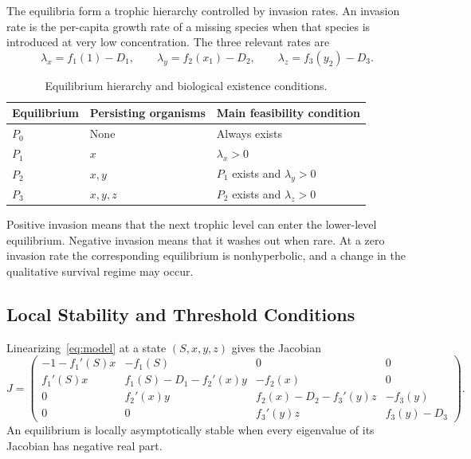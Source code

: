 The equilibria form a trophic hierarchy controlled by invasion rates.  An
invasion rate is the per-capita growth rate of a missing species when that
species is introduced at very low concentration.  The three relevant rates
are
\begin{equation}
\label{eq:invasion-rates}
\lambda_x=f_1(1)-D_1,\qquad
\lambda_y=f_2(x_1)-D_2,\qquad
\lambda_z=f_3(y_2)-D_3.
\end{equation}

\begin{table}[htbp]
\centering
\caption{Equilibrium hierarchy and biological existence conditions.}
\label{tab:equilibrium-existence}
\begin{tabular}{lll}
\toprule
Equilibrium & Persisting organisms & Main feasibility condition \\
\midrule
\(P_0\) & None & Always exists \\
\(P_1\) & \(x\) & \(\lambda_x>0\) \\
\(P_2\) & \(x,y\) & \(P_1\) exists and \(\lambda_y>0\) \\
\(P_3\) & \(x,y,z\) & \(P_2\) exists and \(\lambda_z>0\) \\
\bottomrule
\end{tabular}
\end{table}

Positive invasion means that the next trophic level can enter the lower-level
equilibrium.  Negative invasion means that it washes out when rare.  At a zero
invasion rate the corresponding equilibrium is nonhyperbolic, and a change in
the qualitative survival regime may occur.

\subsection{Local Stability and Threshold Conditions}

Linearizing~\eqref{eq:model} at a state \((S,x,y,z)\) gives the Jacobian
\begin{equation}
\label{eq:jacobian}
J=\begin{pmatrix}
-1-f_1'(S)x & -f_1(S) & 0 & 0\\
f_1'(S)x & f_1(S)-D_1-f_2'(x)y & -f_2(x) & 0\\
0 & f_2'(x)y & f_2(x)-D_2-f_3'(y)z & -f_3(y)\\
0 & 0 & f_3'(y)z & f_3(y)-D_3
\end{pmatrix}.
\end{equation}
An equilibrium is locally asymptotically stable when every eigenvalue of its
Jacobian has negative real part.


